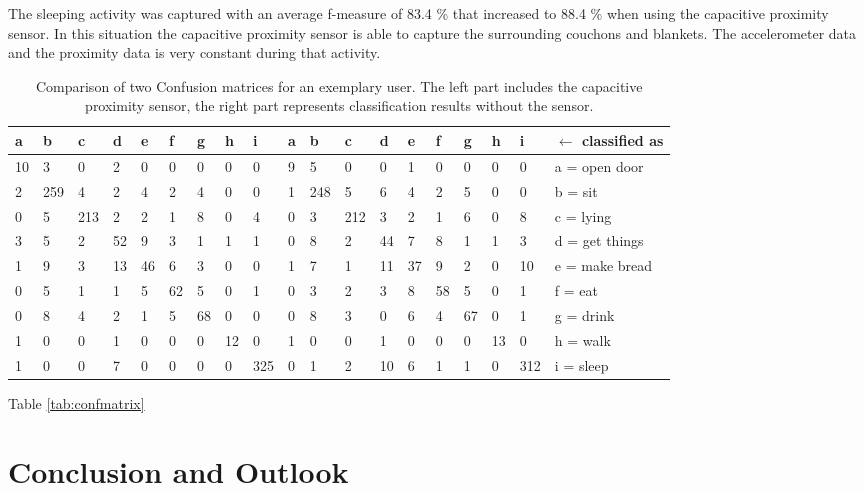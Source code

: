 \documentclass[runningheads,a4paper]{llncs}
\begin{document}
The sleeping activity was captured with an average f-measure of 83.4 \% that increased to 88.4 \% when using the capacitive proximity sensor. In this situation the capacitive proximity sensor is able to capture the surrounding couchons and blankets. The accelerometer data and the proximity data is very constant during that activity. 

\begin{table}[htbp]
	\centering	\begin{tabular}{p{0.48cm}p{0.48cm}p{0.48cm}p{0.48cm}p{0.48cm}p{0.48cm}p{0.48cm}p{0.48cm}p{0.48cm}|p{0.48cm}p{0.48cm}p{0.48cm}p{0.48cm}p{0.48cm}p{0.48cm}p{0.48cm}p{0.48cm}p{0.48cm}|p{2.2cm}}
a & b & c & d & e & f & g & h & i & a & b & c & d & e & f & g & h & i & $\leftarrow$ classified as\\
\hline
10 & 3 & 0 & 2 & 0 & 0 & 0 & 0 & 0 		& 9 & 5 & 0 & 0 & 1 & 0 & 0 & 0 & 0 & a = open door\\
\hline
2 & 259 & 4 & 2 & 4 & 2 & 4 & 0 & 0 	& 1 & 248 & 5 & 6 & 4 & 2 & 5 & 0 & 0 & b = sit\\
\hline
0 & 5 & 213 & 2 & 2 & 1 & 8 & 0 & 4 	& 0 & 3 & 212 & 3 & 2 & 1 & 6 & 0 & 8 & c = lying\\
\hline
3 & 5 & 2 & 52 & 9 & 3 & 1 & 1 & 1 		& 0 & 8 & 2 & 44 & 7 & 8 & 1 & 1 & 3 & d = get things\\
\hline
1 & 9 & 3 & 13 & 46 & 6 & 3 & 0 & 0 	& 1 & 7 & 1 & 11 & 37 & 9 & 2 & 0 & 10 & e = make bread\\
\hline
0 & 5 & 1 & 1 & 5 & 62 & 5 & 0 & 1 		& 0 & 3 & 2 & 3 & 8 & 58 & 5 & 0 & 1 & f = eat\\
\hline
0 & 8 & 4 & 2 & 1 & 5 & 68 & 0 & 0 		& 0 & 8 & 3 & 0 & 6 & 4 & 67 & 0 & 1 & g = drink\\
\hline
1 & 0 & 0 & 1 & 0 & 0 & 0 & 12 & 0 		& 1 & 0 & 0 & 1 & 0 & 0 & 0 & 13 & 0 & h = walk\\
\hline
1 & 0 & 0 & 7 & 0 & 0 & 0 & 0 & 325 	& 0 & 1 & 2 & 10 & 6 & 1 & 1 & 0 & 312 & i = sleep\\
		\end{tabular}
	\caption{Comparison of two Confusion matrices for an exemplary user. The left part includes the capacitive proximity sensor, the right part represents classification results without the sensor.}
	\label{tab:ConfusionMatrixForAnExemplaryUser}
\end{table}

Table \ref{tab:confmatrix} 

\section{Conclusion and Outlook}
\label{sect:conclusions}
\end{document}
